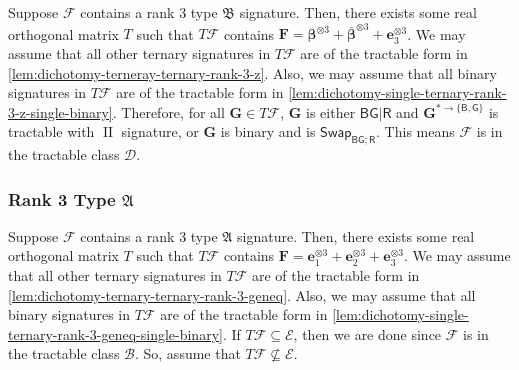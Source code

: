 \documentclass[11pt]{article}
\DeclareMathOperator{\typeii}{II}
\newcommand{\db}{\mathsf{B}}
\newcommand{\dg}{\mathsf{G}}
\newcommand{\dr}{\mathsf{R}}
\newcommand{\swhelper}[1]{$\mathsf{Swap}_{#1}$\xspace}
\newcommand{\swbg}{\swhelper{\db \dg; \dr}}
\newcommand{\teh}{^{\otimes 3}}
\newcommand{\domres}[1]{
  ^{*\to\{#1\}}
}
\newcommand{\tractE}{$\mathscr{B}$\xspace}
\newcommand{\tractBGR}{$\mathscr{D}$\xspace}
\newcommand{\ternarytractgeneq}{$\mathfrak{A}$\xspace}
\newcommand{\ternarytractz}{$\mathfrak{B}$\xspace}
\begin{document}
Suppose $\mathcal{F}$ contains a rank $3$ type \ternarytractz signature.
Then, there exists some real orthogonal matrix $T$ such that $T \mathcal{F}$ contains $\mathbf{F} = \boldsymbol{\beta}\teh + \overline{\boldsymbol{\beta}}\teh + \mathbf{e}_3\teh $.
We may assume that all other ternary signatures in $T \mathcal{F}$ are of the tractable form in \cref{lem:dichotomy-terneray-ternary-rank-3-z}.
Also, we may assume that all binary signatures in $T \mathcal{F}$ are of the tractable form in \cref{lem:dichotomy-single-ternary-rank-3-z-single-binary}.
Therefore, for all $\mathbf{G} \in T \mathcal{F}$, $\mathbf{G}$ is either $\db \dg | \dr$ and $\mathbf{G} \domres{\db, \dg}$ is tractable with $\typeii$ signature, or $\mathbf{G}$ is binary and is \swbg. 
This means $\mathcal{F}$ is in the tractable class \tractBGR.


\subsubsection{
Rank 3 Type \texorpdfstring{\ternarytractgeneq}{A}
}\label{subsec:contains-rank-3-geneq}

Suppose $\mathcal{F}$ contains a rank $3$ type \ternarytractgeneq signature.
Then, there exists some real orthogonal matrix $T$ such that $T \mathcal{F}$ contains $\mathbf{F} = \mathbf{e}_1\teh + \mathbf{e}_2 \teh + \mathbf{e}_3 \teh$.   
We may assume that all other ternary signatures in $T \mathcal{F}$ are of the tractable form in \cref{lem:dichotomy-ternary-ternary-rank-3-geneq}.
Also, we may assume that all binary signatures in $T \mathcal{F}$ are of the tractable form in \cref{lem:dichotomy-single-ternary-rank-3-geneq-single-binary}.
If $T \mathcal{F} \subseteq \mathcal{E}$, then we are done since $\mathcal{F}$ is in the tractable class \tractE.
So, assume that $T \mathcal{F} \not \subseteq \mathcal{E}$.
\end{document}
